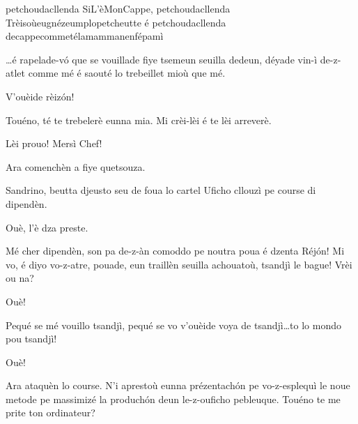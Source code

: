 \begin{drama}



\Saventaspeaks{} petchoudacllenda SiL'èMon\-Cap\-pe, petchoudacllenda Trèisoùeugnézeumplope\-tcheut\-te é pe\-tchou\-da\-cllen\-da decappecommetélamammanenfépamì

\Treisouspeaks \ldots é rapelade-v\'o que se vouillade fiye tsemeun seuilla dedeun, déyade vin-ì de-z-atlet comme mé é saouté lo trebeillet mioù que mé. 

\Richardspeaks V'ouèide rèiz\'on! 

\Treisouspeaks{} Touéno, té te trebelerè eunna mia. Mi crèi-lèi é te lèi arreverè.

\Tuenospeaks Lèi prouo! Mersì Chef!

\Treisouspeaks Ara comenchèn a fiye quetsouza.



\Treisouspeaks{} Sandrino, beutta djeusto seu de foua lo cartel  \og Uficho cllouzì pe course di dipendèn\fg.

\Sandrinospeaks Ouè, l’è dza preste.



\Treisouspeaks Mé cher dipendèn, son pa de-z-àn comoddo pe noutra poua é dzenta Réj\'on!
Mi vo, é diyo vo-z-atre, pouade, eun traillèn seuilla achouatoù, tsandjì le bague! Vrèi ou na?

\Tcheuttespeaks{} Ouè!

\Treisouspeaks{} Pequé se mé vouillo tsandjì, pequé se vo v'ou\-èi\-de voya de tsandjì\ldots to lo mondo pou tsandjì!

\Tcheuttespeaks{} Ouè!

\Treisouspeaks Ara ataquèn lo course. N'i aprestoù eunna prézentach\'on pe vo-z-esplequì le noue metode pe massimizé la produch\'on deun le-z-ouficho pebleuque.  Touéno te me prite ton ordinateur?


\end{drama}
